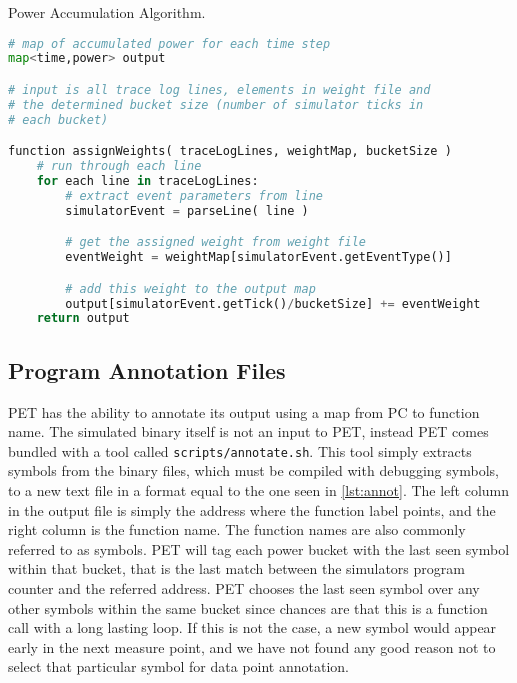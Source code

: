 \begin{algorithm}
\caption{Power Accumulation Algorithm.}
\label{alg:power_accum_algo}
\begin{lstlisting}[language=Python,style=algo]
# map of accumulated power for each time step
map<time,power> output

# input is all trace log lines, elements in weight file and
# the determined bucket size (number of simulator ticks in
# each bucket)

function assignWeights( traceLogLines, weightMap, bucketSize )
    # run through each line
    for each line in traceLogLines:
        # extract event parameters from line
        simulatorEvent = parseLine( line )

        # get the assigned weight from weight file
        eventWeight = weightMap[simulatorEvent.getEventType()]

        # add this weight to the output map
        output[simulatorEvent.getTick()/bucketSize] += eventWeight
    return output
\end{lstlisting}
\end{algorithm}
%

\subsection{Program Annotation Files}
\label{subsec:annot}

PET has the ability to annotate its output using a map from PC to function
name. The simulated binary itself is not an input to PET, instead PET comes
bundled with a tool called \texttt{scripts/annotate.sh}. This tool simply
extracts symbols from the binary files, which must be compiled with debugging
symbols, to a new text file in a format equal to the one seen in
\autoref{lst:annot}. The left column in the output file is simply the address
where the function label points, and the right column is the function name. The
function names are also commonly referred to as symbols. PET will tag each power
bucket with the last seen symbol within that bucket, that is the last match
between the simulators program counter and the referred address. PET chooses the
last seen symbol over any other symbols within the same bucket since chances are
that this is a function call with a long lasting loop. If this is not the case,
a new symbol would appear early in the next measure point, and we have not found
any good reason not to select that particular symbol for data point annotation.



